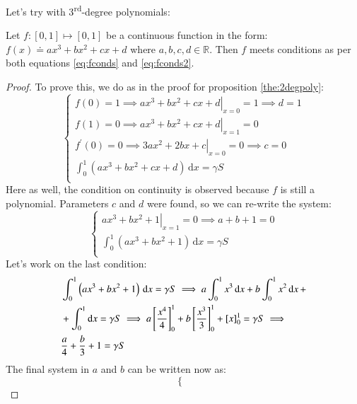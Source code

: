 Let's try with 3\textsuperscript{rd}-degree polynomials:
\begin{proposition}
\label{the:3degpoly}
Let $f:[0,1] \mapsto [0,1]$ be a continuous function in the form: 
$f(x) \doteq ax^3+bx^2+cx+d$ where $a,b,c,d \in \mathbb{R}$. 
Then $f$ meets conditions as per both
equations \ref{eq:fconds} and \ref{eq:fconds2}.
\begin{proof}
To prove this, we do as in the proof for proposition \ref{the:2degpoly}:
\begin{equation*}
\begin{cases}
f(0)=1 \implies \left. ax^3+bx^2+cx+d \right|_{x=0} = 1 \implies d = 1 \\
f(1)=0 \implies \left. ax^3+bx^2+cx+d \right|_{x=1} = 0\\
f^\prime(0) = 0 \implies \left. 3ax^2 + 2bx + c \right|_{x=0} = 0 \implies c = 0 \\
\int^{1}_{0} \left( ax^3+bx^2+cx+d \right) \, \mathrm{d} x = \gamma S \\
\end{cases}
\end{equation*}
Here as well, the condition on continuity is observed because $f$ is 
still a polynomial.
Parameters $c$ and $d$ were found, so we can re-write the system:
\begin{equation*}
\begin{cases}
\left. ax^3+bx^2+1 \right|_{x=1} = 0 \implies a+b+1=0\\
\int^{1}_{0} \left( ax^3+bx^2+1 \right) \, \mathrm{d} x = \gamma S \\
\end{cases}
\end{equation*}
Let's work on the last condition:
\begin{align*}
&\int^{1}_{0} \left( ax^3+bx^2+1 \right) \, \mathrm{d} x = \gamma S
\implies
a\int^{1}_{0} x^3 \, \mathrm{d} x + b \int^{1}_{0} x^2 \, \mathrm{d} x \, + \notag\\ 
&+ \int^{1}_{0} \mathrm{d} x= 
        \gamma S \implies 
        a \left[\frac{x^4}{4}\right]_0^1 + b \left[\frac{x^3}{3}\right]_0^1 +
        \left[x\right]_0^1 = \gamma S \implies \notag\\
&\frac{a}{4} + \frac{b}{3} + 1 = \gamma S 
\end{align*}
The final system in $a$ and $b$ can be written now as:
\begin{equation}\label{eq:3degsys}
\begin{cases}

\end{cases}
\end{equation}
\end{proof}
\end{proposition}
